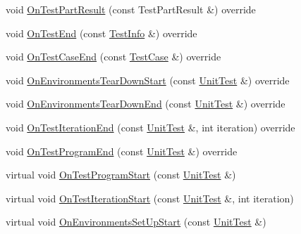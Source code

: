 \begin{DoxyCompactItemize}
\item 
void \mbox{\hyperlink{classtesting_1_1internal_1_1_event_recording_listener_a9122b67d43420a41d1cfe9307809e078}{On\+Test\+Part\+Result}} (const Test\+Part\+Result \&) override
\item 
void \mbox{\hyperlink{classtesting_1_1internal_1_1_event_recording_listener_ab374bf69a73cd7dd8fcef5aea1209728}{On\+Test\+End}} (const \mbox{\hyperlink{classtesting_1_1_test_info}{Test\+Info}} \&) override
\item 
void \mbox{\hyperlink{classtesting_1_1internal_1_1_event_recording_listener_a52788314427f5c7a4585ea0bf5f3c251}{On\+Test\+Case\+End}} (const \mbox{\hyperlink{classtesting_1_1_test_case}{Test\+Case}} \&) override
\item 
void \mbox{\hyperlink{classtesting_1_1internal_1_1_event_recording_listener_aab8379a206927984cdb7b84399a122a5}{On\+Environments\+Tear\+Down\+Start}} (const \mbox{\hyperlink{classtesting_1_1_unit_test}{Unit\+Test}} \&) override
\item 
void \mbox{\hyperlink{classtesting_1_1internal_1_1_event_recording_listener_ab96b8b58a318ebe79df4295e2da6a289}{On\+Environments\+Tear\+Down\+End}} (const \mbox{\hyperlink{classtesting_1_1_unit_test}{Unit\+Test}} \&) override
\item 
void \mbox{\hyperlink{classtesting_1_1internal_1_1_event_recording_listener_a48f6f53c044e8cb6425f9bc7319ddecc}{On\+Test\+Iteration\+End}} (const \mbox{\hyperlink{classtesting_1_1_unit_test}{Unit\+Test}} \&, int iteration) override
\item 
void \mbox{\hyperlink{classtesting_1_1internal_1_1_event_recording_listener_a22952f706a15c028d4b43256602035bb}{On\+Test\+Program\+End}} (const \mbox{\hyperlink{classtesting_1_1_unit_test}{Unit\+Test}} \&) override
\item 
virtual void \mbox{\hyperlink{classtesting_1_1internal_1_1_event_recording_listener_aff89fdd3ae889a54a2ba2f3d4c98d3f6}{On\+Test\+Program\+Start}} (const \mbox{\hyperlink{classtesting_1_1_unit_test}{Unit\+Test}} \&)
\item 
virtual void \mbox{\hyperlink{classtesting_1_1internal_1_1_event_recording_listener_a0bfa276def9594b2a119c2c370f59281}{On\+Test\+Iteration\+Start}} (const \mbox{\hyperlink{classtesting_1_1_unit_test}{Unit\+Test}} \&, int iteration)
\item 
virtual void \mbox{\hyperlink{classtesting_1_1internal_1_1_event_recording_listener_add61e6e7ebffb8afc90ccabcdc9f9982}{On\+Environments\+Set\+Up\+Start}} (const \mbox{\hyperlink{classtesting_1_1_unit_test}{Unit\+Test}} \&)

\end{DoxyCompactItemize}
